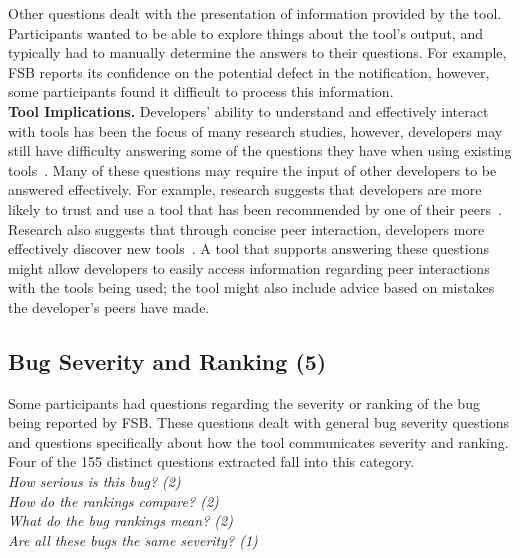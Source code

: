\documentclass[conference]{IEEEtran}
\begin{document}
Other questions dealt with the presentation of information provided by the tool. 
Participants wanted to be able to explore things about the tool's output, and typically had to manually determine the answers to their questions. 
For example, FSB reports its confidence on the potential defect in the notification, however, some participants found it difficult to process this information.
\\


\noindent\textbf{Tool Implications.}
Developers' ability to understand and effectively interact with tools has been the focus of many research studies, however, developers may still have difficulty answering some of the questions they have when using existing tools~\cite{ko2004designing, khoo2008path, johnson2013don}. 
Many of these questions may require the input of other developers to be answered effectively. 
For example, research suggests that developers are more likely to trust and use a tool that has been recommended by one of their peers~\cite{murphy2010trust}.
Research also suggests that through concise peer interaction, developers more effectively discover new tools~\cite{murphy2011peer}. 
A tool that supports answering these questions might allow developers to easily access information regarding peer interactions with the tools being used; the tool might also include advice based on mistakes the developer's peers have made. 
 





\noindent\subsection{\textbf{Bug Severity and Ranking (5)}}\label{bsr}

Some participants had questions regarding the severity or ranking of the bug being reported by FSB. 
These questions dealt with general bug severity questions and questions specifically about how the tool communicates severity and ranking. 
Four of the 155 distinct questions extracted fall into this category. 
\\

\noindent\emph{How serious is this bug? (2)} \\
\emph{How do the rankings compare? (2)} \\
\emph{What do the bug rankings mean? (2)} \\
\emph{Are all these bugs the same severity? (1)} \\
\end{document}

